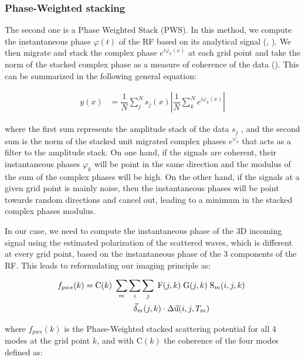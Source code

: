\documentclass[9pt,a4paper]{article}
\numberwithin{equation}{section}
\begin{document}
\begin{multicols}{2}
\subsubsection{Phase-Weighted stacking}

The second one is a Phase Weighted Stack (PWS).
In this method, we compute the instantaneous phase $\varphi(t)$ of the RF based on its analytical signal (\cite{schi_gji_97}, \cite{cost_gphy_18}).
We then migrate and stack the complex phase $e^{i\varphi_k(x)}$ at each grid point and take the norm of the stacked complex phase as a measure of coherence of the data (\cite{coop_saga_07}).
This can be summarized in the following general equation:

\begin{align}
  y(x) &= \dfrac{1}{N} \sum_j^N s_j(x) \left\vert \dfrac{1}{N} \sum_k^N e^{i\varphi_k(x)} \right\vert
  \label{pws_1}
\end{align}
\vspace{1mm}

\noindent where the first sum represents the amplitude stack of the data $s_j$ , and the second sum is the norm of the stacked unit migrated complex phases $e^{\varphi_k}$ that acts as a filter to the amplitude stack.
On one hand, if the signals are coherent, their instantaneous phases $\varphi_k$ will be point in the same direction and the modulus of the sum of the complex phases will be high.
On the other hand, if the signals at a given grid point is mainly noise, then the instantaneous phases will be point towards random directions and cancel out, leading to a minimum in the stacked complex phases modulus.

In our case, we need to compute the instantaneous phase of the 3D incoming signal using the estimated polarization of the scattered waves, which is different at every grid point, based on the instantaneous phase of the 3 components of the RF.
This leads to reformulating our imaging principle as:

\begin{align}
  f_{pws}(k) &= \text{C}(k) \; \sum_m \sum_i \sum_j \; \text{F}(j,k) \; \text{G}(j,k) \; \text{S}_{m}(i,j,k) \; \notag\\&\qquad\qquad\qquad \vec{\delta}_{m}(j,k) \cdot \Delta\vec{\text{u}}(i,j,T_m)
  \label{pws}
\end{align}
\vspace{1mm}

\noindent where $f_{pws}(k)$ is the Phase-Weighted stacked scattering potential for all 4 modes at the grid point $k$, and with C$(k)$ the coherence of the four modes defined as:


\end{multicols}
\end{document}
